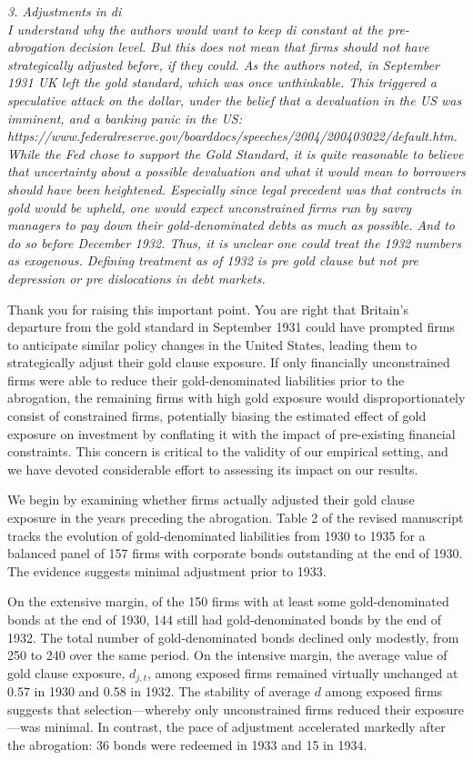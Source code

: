 \noindent \textit{\textcolor{red!60!black}{
3. Adjustments in di\\ 
I understand why the authors would want to keep di constant at the pre-abrogation decision level. But this does not mean that firms should not have strategically adjusted before, if they could. As the authors noted, in September 1931 UK left the gold standard, which was once unthinkable. This triggered a speculative attack on the dollar, under the belief that a devaluation in the US was imminent, and a banking panic in the US: https://www.federalreserve.gov/boarddocs/speeches/2004/200403022/default.htm. While the Fed chose to support the Gold Standard, it is quite reasonable to believe that uncertainty about a possible devaluation and what it would mean to borrowers should have been heightened. Especially since legal precedent was that contracts in gold would be upheld, one would expect unconstrained firms run by savvy managers to pay down their gold-denominated debts as much as possible. And to do so before December 1932. Thus, it is unclear one could treat the 1932 numbers as exogenous. Defining treatment as of 1932 is pre gold clause but not pre depression or pre dislocations in debt markets.
}}

\noindent Thank you for raising this important point. You are right that Britain's departure from the gold standard in September 1931 could have prompted firms to anticipate similar policy changes in the United States, leading them to strategically adjust their gold clause exposure. If only financially unconstrained firms were able to reduce their gold-denominated liabilities prior to the abrogation, the remaining firms with high gold exposure would disproportionately consist of constrained firms, potentially biasing the estimated effect of gold exposure on investment by conflating it with the impact of pre-existing financial constraints. This concern is critical to the validity of our empirical setting, and we have devoted considerable effort to assessing its impact on our results.

We begin by examining whether firms actually adjusted their gold clause exposure in the years preceding the abrogation. Table 2 of the revised manuscript tracks the evolution of gold-denominated liabilities from 1930 to 1935 for a balanced panel of 157 firms with corporate bonds outstanding at the end of 1930. The evidence suggests minimal adjustment prior to 1933. 

On the extensive margin, of the 150 firms with at least some gold-denominated bonds at the end of 1930, 144 still had gold-denominated bonds by the end of 1932. The total number of gold-denominated bonds declined only modestly, from 250 to 240 over the same period. On the intensive margin, the average value of gold clause exposure, $d_{j,t}$, among exposed firms remained virtually unchanged at 0.57 in 1930 and 0.58 in 1932. The stability of average $d$ among exposed firms suggests that selection---whereby only unconstrained firms reduced their exposure---was minimal. In contrast, the pace of adjustment accelerated markedly after the abrogation: 36 bonds were redeemed in 1933 and 15 in 1934.

